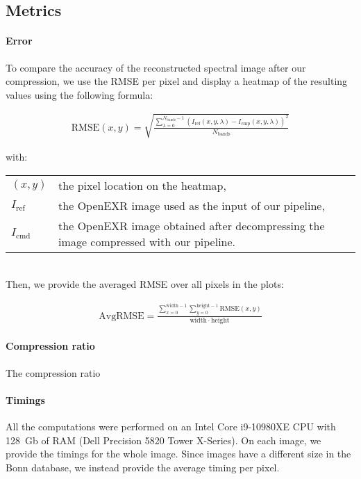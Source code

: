 \subsection{Metrics}

\paragraph{Error}
To compare the accuracy of the reconstructed spectral image after our compression, we use the RMSE per pixel and display a heatmap of the resulting values using the following formula:

\begin{align}
    \mathrm{RMSE}(x, y) = \sqrt{\frac{\sum_{\lambda = 0}^{N_\mathrm{bands} - 1} \left(I_\mathrm{ref}(x, y, \lambda) - I_\mathrm{cmp}(x, y, \lambda) \right)^2}{N_\mathrm{bands}}}
\end{align}

with:

\begin{tabularx}{\linewidth}{lX}
    $(x, y)$ & the pixel location on the heatmap, \\
    $I_\mathrm{ref}$ & the OpenEXR image used as the input of our pipeline, \\
    $I_\mathrm{cmd}$ & the OpenEXR image obtained after decompressing the image compressed with our pipeline. \\
\end{tabularx}\\

Then, we provide the averaged RMSE over all pixels in the plots:

\begin{align}
    \mathrm{AvgRMSE} = \frac{\sum_{x = 0}^{\mathrm{width} - 1} \sum_{y = 0}^{\mathrm{height} - 1} \mathrm{RMSE}(x, y)}{\mathrm{width} \cdot \mathrm{height}}
\end{align}


\paragraph{Compression ratio}

The compression ratio

\paragraph{Timings}

All the computations were performed on an Intel Core i9-10980XE CPU with 128~Gb of RAM (Dell Precision 5820 Tower X-Series). On each image, we provide the timings for the whole image. Since images have a different size in the Bonn database, we instead provide the average timing per pixel.

\clearpage
